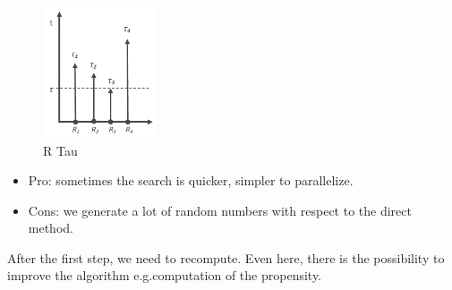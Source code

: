  \begin{figure}
    \centering
    \includegraphics[width=0.3\textwidth]{R_tau.png}
    \caption{R Tau}
    \label{fig:tau}
  \end{figure}

\begin{itemize}
\item Pro: sometimes the search is quicker, simpler to parallelize. 
\item Cons: we generate a lot of random numbers with respect to the direct method.
\end{itemize}

After the first step, we need to recompute. Even here, there is the possibility to improve the algorithm e.g.computation of the propensity.

